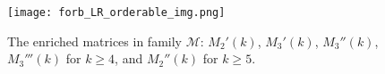\documentclass[12pt]{book}
\theoremstyle{plain}
\theoremstyle{remark}
\begin{document}
\begin{comment}
\begin{figure}[H]
\small{
	\centering
	\begin{align*}
			M_2'(k) = \bordermatrix{ & \cr
						& 1 1 1 \ldots 1 1 1\cr
		   \textbf L &  1 0 0 \ldots 0 0 0\cr
						& 1  1 0  \ldots  0 0 0\cr
						& \ddots  \cr
						& 0 0 0 \ldots 1 1 0 \cr
		   \textbf L & 1 1 1 \ldots 1 0 1 }\
			&&
			M_2''(k) = \bordermatrix{ & \cr
	    \textbf R & 1  1  1 \ldots  1 1 1\cr
		\textbf L & 1  0 0 \ldots  0 0 0\cr
					& 1  1 0  \ldots  0 0 0\cr
	    			    & \ddots \cr
	    				& 0 0 0  \ldots  1 1 0 \cr
		 \textbf R &  0 0 0 \ldots  0 1  0 \cr
	 \textbf{L} & 1  1 1 \ldots  1 1  1  }\
			&&
			M_3'(k) =  \bordermatrix{ & \cr
			\textbf L &  1 0  0   \ldots   0   0   0 \cr
				&   1  1 0   \ldots   0   0   0 \cr
				& \ddots \cr
				& 0 0  0   \ldots   1   1   0 \cr
				& 1 1 1   \ldots   1   0   1  }\
			\end{align*}
		\begin{align*}
			M_3''(k) = \bordermatrix{ & \cr
				& 1   1  0  \ldots  0 0  \cr
				& 0  1  1   \ldots  0 0  \cr
				& \ddots \cr
				& 0 0 0   \ldots  1 1 \cr
				\textbf R & 0 1 1  \ldots  1  0  }\
			&&
			M_4' =  \bordermatrix{ & \cr
					\textbf L & 1  0  0  0 0 \cr
					& 0  1   1   0  0 \cr
					& 0  0  0  1   1 \cr
					& 1  0  1  0  1 }\
			&&
			M_4'' =  \bordermatrix{ & \cr
					\textbf L & 1  0  0  0 \cr
					\textbf R & 0  1  0  0 \cr
								& 0  0  1  1 \cr
								 &  1  1   0   1 }\		
	\end{align*}
	\begin{align*}	
			M_5' =  \bordermatrix{ & \cr
					& 1   1   0   0   \cr
					& 0   0   1   1   \cr
					\textbf R & 1   0   0   1  \cr
					& 1   1   1   }\
			&&
			M_5'' =  \bordermatrix{ & \cr
					\textbf L & 1  0   0   0 \cr
					& 0  1   1   0 \cr
					& 1   0   1   1 \cr
					\textbf L & 1  1   1  0 }\
	\end{align*}	
		}
	\caption{The enriched matrices in family $\mathcal{M}$: $M_{2}'(k)$, $M_{3}'(k)$, $M_{3}''(k)$, $M_{3}'''(k)$ for $k \geq 4$, and $M_{2}''(k)$ for $k \geq 5$. }  \label{fig:forb_LR-orderable}
\end{figure}
\end{comment}

\begin{figure}[h]
	\centering
	\texttt{[image: forb\_LR\_orderable\_img.png]}
	\caption{The enriched matrices in family $\mathcal{M}$: $M_{2}'(k)$, $M_{3}'(k)$, $M_{3}''(k)$, $M_{3}'''(k)$ for $k \geq 4$, and $M_{2}''(k)$ for $k \geq 5$. }  \label{fig:forb_LR-orderable}
\end{figure}
\end{document}
